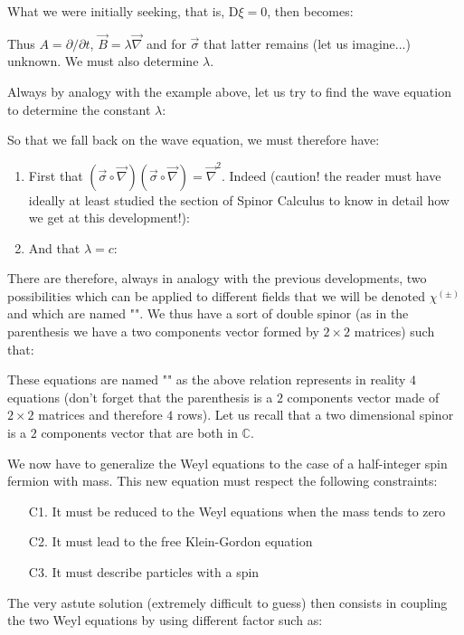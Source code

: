 	What we were initially seeking, that is, $\mathrm{D}\xi=0$, then becomes:
	
	Thus $A=\partial/\partial t$, $\vec{B}=\lambda\vec{\nabla}$ and for $\vec{\sigma}$ that latter remains (let us imagine...) unknown. We must also determine $\lambda$.
	
	Always by analogy with the example above, let us try to find the wave equation to determine the constant $\lambda$:
	
	So that we fall back on the wave equation, we must therefore have:
	\begin{enumerate}
		\item First that $\left(\vec{\sigma}\circ\vec{\nabla}\right)\left(\vec{\sigma}\circ\vec{\nabla}\right)=\vec{\nabla}^2$. Indeed (caution! the reader must have ideally at least studied the section of Spinor Calculus to know in detail how we get at this development!):
		
	
		\item And that $\lambda=c$:
		
	\end{enumerate}
	There are therefore, always in analogy with the previous developments, two possibilities which can be applied to different fields that we will be denoted $\chi^{(\pm)}$ and which are named "". We thus have a sort of double spinor (as in the parenthesis we have a two components vector formed by $2\times 2$ matrices) such that:
	
	These equations are named "" as the above relation represents in reality $4$ equations (don't forget that the parenthesis is a $2$ components vector made of $2\times 2$ matrices and therefore $4$ rows). Let us recall that a two dimensional spinor is a $2$ components vector that are both in $\mathbb{C}$.

	We now have to generalize the Weyl equations to the case of a half-integer spin fermion with mass. This new equation must respect the following constraints:
	\begin{enumerate}
		\item[C1.] It must be reduced to the Weyl equations when the mass tends to zero

		\item[C2.] It must lead to the free Klein-Gordon equation

		\item[C3.] It must describe particles with a spin
	\end{enumerate}
	The very astute solution (extremely difficult to guess) then consists in coupling the two Weyl equations by using different factor such as:
	
